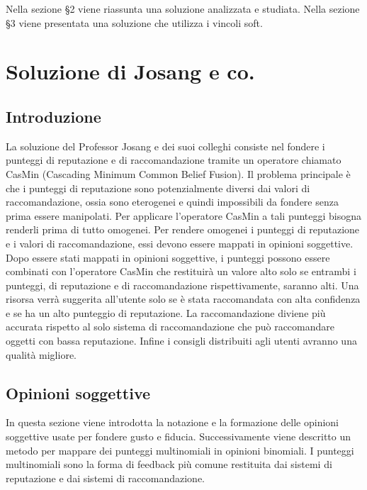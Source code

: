 \documentclass{report}
\begin{document}
	Nella sezione §2 viene riassunta una soluzione analizzata e studiata.
	Nella sezione §3 viene presentata una soluzione che utilizza i vincoli
	soft.
	\newpage
	\hypertarget{header-n25}{%
		\section{Soluzione di Josang e co.}\label{header-n25}}
	
	\hypertarget{header-n26}{%
		\subsection{Introduzione}\label{header-n26}}
	
	La soluzione del Professor Josang e dei suoi colleghi consiste nel
	fondere i punteggi di reputazione e di raccomandazione tramite un
	operatore chiamato CasMin (Cascading Minimum Common Belief Fusion). Il
	problema principale è che i punteggi di reputazione sono potenzialmente
	diversi dai valori di raccomandazione, ossia sono eterogenei e quindi
	impossibili da fondere senza prima essere manipolati. Per applicare
	l'operatore CasMin a tali punteggi bisogna renderli prima di tutto
	omogenei. Per rendere omogenei i punteggi di reputazione e i valori di
	raccomandazione, essi devono essere mappati in opinioni soggettive. Dopo
	essere stati mappati in opinioni soggettive, i punteggi possono essere
	combinati con l'operatore CasMin che restituirà un valore alto solo se
	entrambi i punteggi, di reputazione e di raccomandazione
	rispettivamente, saranno alti. Una risorsa verrà suggerita all'utente
	solo se è stata raccomandata con alta confidenza e se ha un alto
	punteggio di reputazione. La raccomandazione diviene più accurata
	rispetto al solo sistema di raccomandazione che può raccomandare
	oggetti con bassa reputazione. Infine i consigli distribuiti agli utenti
	avranno una qualità migliore.
	
	\hypertarget{header-n47}{%
		\subsection{Opinioni soggettive}\label{header-n47}}
	
	In questa sezione viene introdotta la notazione e la formazione delle
	opinioni soggettive usate per fondere gusto e fiducia. Successivamente
	viene descritto un metodo per mappare dei punteggi multinomiali in
	opinioni binomiali. I punteggi multinomiali sono la forma di feedback più comune
	restituita dai sistemi di reputazione e dai sistemi di raccomandazione.
	
\end{document}
